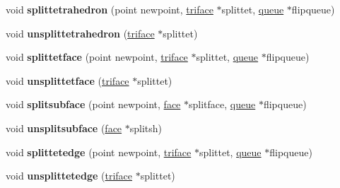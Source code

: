 \begin{DoxyCompactItemize}
void {\bfseries splittetrahedron} (point newpoint, \hyperlink{classStemMesh3D_1_1tetgenmesh_1_1triface}{triface} $\ast$splittet, \hyperlink{classStemMesh3D_1_1tetgenmesh_1_1queue}{queue} $\ast$flipqueue)
\item 
\mbox{\label{classStemMesh3D_1_1tetgenmesh_a51c177bd1aa972e2abf95d79c218d71f}} 
void {\bfseries unsplittetrahedron} (\hyperlink{classStemMesh3D_1_1tetgenmesh_1_1triface}{triface} $\ast$splittet)
\item 
\mbox{\label{classStemMesh3D_1_1tetgenmesh_a641498dcb482ce9a3565878903772fda}} 
void {\bfseries splittetface} (point newpoint, \hyperlink{classStemMesh3D_1_1tetgenmesh_1_1triface}{triface} $\ast$splittet, \hyperlink{classStemMesh3D_1_1tetgenmesh_1_1queue}{queue} $\ast$flipqueue)
\item 
\mbox{\label{classStemMesh3D_1_1tetgenmesh_ad149885a0546cd89a63c4280b1337aae}} 
void {\bfseries unsplittetface} (\hyperlink{classStemMesh3D_1_1tetgenmesh_1_1triface}{triface} $\ast$splittet)
\item 
\mbox{\label{classStemMesh3D_1_1tetgenmesh_aeef032b860118de3690e584704646dd4}} 
void {\bfseries splitsubface} (point newpoint, \hyperlink{classStemMesh3D_1_1tetgenmesh_1_1face}{face} $\ast$splitface, \hyperlink{classStemMesh3D_1_1tetgenmesh_1_1queue}{queue} $\ast$flipqueue)
\item 
\mbox{\label{classStemMesh3D_1_1tetgenmesh_ae9f51a19005c8b990209c119a015d3e5}} 
void {\bfseries unsplitsubface} (\hyperlink{classStemMesh3D_1_1tetgenmesh_1_1face}{face} $\ast$splitsh)
\item 
\mbox{\label{classStemMesh3D_1_1tetgenmesh_a2ce93ae6c8c290c160150cd163e8eeff}} 
void {\bfseries splittetedge} (point newpoint, \hyperlink{classStemMesh3D_1_1tetgenmesh_1_1triface}{triface} $\ast$splittet, \hyperlink{classStemMesh3D_1_1tetgenmesh_1_1queue}{queue} $\ast$flipqueue)
\item 
\mbox{\label{classStemMesh3D_1_1tetgenmesh_a4337e624dab29cc30094b65b4679f340}} 
void {\bfseries unsplittetedge} (\hyperlink{classStemMesh3D_1_1tetgenmesh_1_1triface}{triface} $\ast$splittet)

\end{DoxyCompactItemize}
